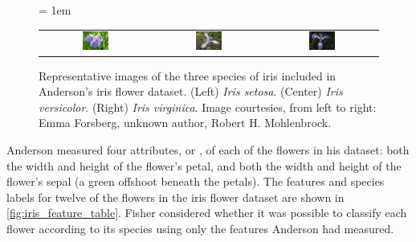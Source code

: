 \begin{figure}[h]
\centering
\tabcolsep = 1em
\mySfFamily
\begin{tabular}{c c c}
\includegraphics[width = 0.25\textwidth]{../images/Iris_setosa_2.jpg} & \includegraphics[width = 0.25\textwidth]{../images/Iris_versicolor.jpg} & \includegraphics[width = 0.25\textwidth]{../images/Iris_virginica.jpg}
\end{tabular}
\caption{Representative images of the three species of iris included in Anderson's iris flower dataset. (Left) \textit{Iris setosa}. (Center)  \textit{Iris versicolor}. (Right) \textit{Iris virginica}. Image courtesies, from left to right: Emma Forsberg, unknown author, Robert H. Mohlenbrock.}
\label{fig:iris_flowers}
\end{figure}

Anderson measured four attributes, or , of each of the flowers in his dataset: both the width and height of the flower's petal, and both the width and height of the flower's sepal (a green offshoot beneath the petals). The features and species labels for twelve of the flowers in the iris flower dataset are shown in \autoref{fig:iris_feature_table}. Fisher considered whether it was possible to classify each flower according to its species using only the features Anderson had measured.\\

